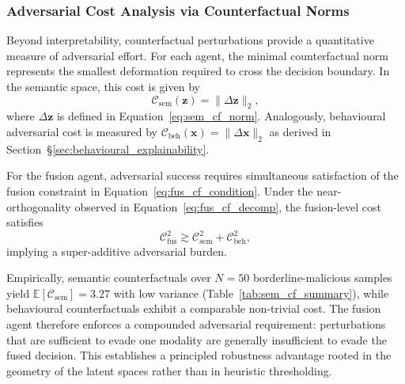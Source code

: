 \documentclass[3p]{elsarticle}
\begin{document}
\subsubsection*{Adversarial Cost Analysis via Counterfactual Norms}

Beyond interpretability, counterfactual perturbations provide a quantitative measure of
adversarial effort.
For each agent, the minimal counterfactual norm represents the smallest deformation
required to cross the decision boundary.
In the semantic space, this cost is given by
\begin{equation}
\mathcal{C}_{\mathrm{sem}}(\mathbf{z})
=
\lVert \Delta \mathbf{z} \rVert_2,
\label{eq:adv_cost_sem}
\end{equation}
where $\Delta \mathbf{z}$ is defined in Equation~\eqref{eq:sem_cf_norm}.
Analogously, behavioural adversarial cost is measured by
$\mathcal{C}_{\mathrm{beh}}(\mathbf{x}) = \lVert \Delta \mathbf{x} \rVert_2$
as derived in Section~\S\ref{sec:behavioural_explainability}.

For the fusion agent, adversarial success requires simultaneous satisfaction of the
fusion constraint in Equation~\eqref{eq:fus_cf_condition}.
Under the near-orthogonality observed in Equation~\eqref{eq:fus_cf_decomp}, the fusion-level
cost satisfies
\begin{equation}
\mathcal{C}_{\mathrm{fus}}^2
\gtrsim
\mathcal{C}_{\mathrm{sem}}^2
+
\mathcal{C}_{\mathrm{beh}}^2,
\label{eq:adv_cost_fusion}
\end{equation}
implying a super-additive adversarial burden.

Empirically, semantic counterfactuals over $N=50$ borderline-malicious samples yield
$\mathbb{E}[\mathcal{C}_{\mathrm{sem}}] = 3.27$ with low variance
(Table~\ref{tab:sem_cf_summary}), while behavioural counterfactuals exhibit a comparable non-trivial cost. The fusion agent therefore enforces a compounded adversarial requirement: perturbations that are sufficient to evade one modality are generally insufficient to evade the fused decision.
This establishes a principled robustness advantage rooted in the geometry of the latent spaces rather than in heuristic thresholding.
\end{document}
